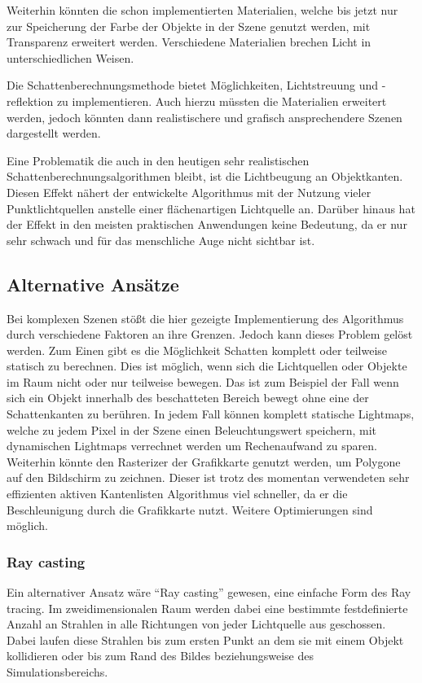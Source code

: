 Weiterhin könnten die schon implementierten Materialien, welche bis jetzt nur zur Speicherung der
Farbe der Objekte in der Szene genutzt werden, mit Transparenz erweitert werden. Verschiedene
Materialien brechen Licht in unterschiedlichen Weisen.

Die Schattenberechnungsmethode bietet Möglichkeiten, Lichtstreuung und -reflektion zu
implementieren. Auch hierzu müssten die Materialien erweitert werden, jedoch könnten dann realistischere und grafisch ansprechendere Szenen dargestellt werden.

Eine Problematik die auch in den heutigen sehr realistischen Schattenberechnungsalgorithmen bleibt, ist die Lichtbeugung an Objektkanten. Diesen Effekt nähert der entwickelte Algorithmus mit der Nutzung vieler Punktlichtquellen anstelle einer flächenartigen Lichtquelle an. Darüber hinaus hat der Effekt in den meisten praktischen Anwendungen keine Bedeutung, da er nur sehr schwach und für das menschliche Auge nicht sichtbar ist.

\subsection{Alternative Ansätze}

Bei komplexen Szenen stößt die hier gezeigte Implementierung des Algorithmus durch verschiedene Faktoren an ihre Grenzen. Jedoch kann dieses Problem
gelöst werden. Zum Einen gibt es die Möglichkeit Schatten komplett oder teilweise statisch zu berechnen.
Dies ist möglich, wenn sich die Lichtquellen oder Objekte im Raum nicht oder nur teilweise bewegen. Das
ist zum Beispiel der Fall wenn sich ein Objekt innerhalb des beschatteten Bereich bewegt ohne eine der
Schattenkanten zu berühren.
In jedem Fall können komplett statische Lightmaps, welche zu jedem Pixel in der Szene einen
Beleuchtungswert speichern, mit dynamischen Lightmaps verrechnet werden um Rechenaufwand zu sparen. Weiterhin könnte den Rasterizer der Grafikkarte genutzt werden, um Polygone auf den Bildschirm zu zeichnen. Dieser ist trotz des momentan verwendeten sehr effizienten aktiven Kantenlisten Algorithmus viel schneller, da er die Beschleunigung durch die Grafikkarte nutzt. Weitere Optimierungen sind möglich.

\subsubsection*{Ray casting}

Ein alternativer Ansatz wäre "`Ray casting"' gewesen, eine einfache Form des Ray tracing. Im zweidimensionalen
Raum werden dabei eine bestimmte festdefinierte Anzahl an Strahlen in alle Richtungen von jeder Lichtquelle
aus geschossen. Dabei laufen diese Strahlen bis zum ersten Punkt an dem sie mit einem Objekt kollidieren
oder bis zum Rand des Bildes beziehungsweise des Simulationsbereichs.


